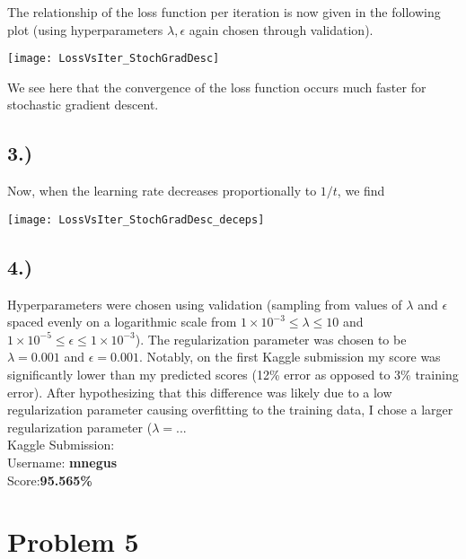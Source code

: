\documentclass{report}
\newcommand{\tab}{\-\hspace{1.5cm}}
\begin{document}
The relationship of the loss function per iteration is now given in the following plot (using hyperparameters $\lambda, \epsilon$ again chosen through validation). \\
\begin{center}
\texttt{[image: LossVsIter\_StochGradDesc]}
\end{center}

We see here that the convergence of the loss function occurs much faster for stochastic gradient descent.


\subsection*{3.)}

Now, when the learning rate decreases proportionally to $1/t$, we find
\begin{center}
\texttt{[image: LossVsIter\_StochGradDesc\_deceps]}
\end{center}


\subsection*{4.)}

Hyperparameters were chosen using validation (sampling from values of $\lambda$ and $\epsilon$ spaced evenly on a logarithmic scale from $1\times10^{-3} \leq \lambda \leq 10$ and $1\times10^{-5} \leq \epsilon \leq 1\times10^{-3}$). The regularization parameter was chosen to be $\lambda = 0.001$ and $\epsilon = 0.001$.  Notably, on the first Kaggle submission my score was significantly lower than my predicted scores (12\% error as opposed to 3\% training error). After hypothesizing that this difference was likely due to a low regularization parameter causing overfitting to the training data, I chose a larger regularization parameter ($\lambda = ... $\\

Kaggle Submission:\\
\tab Username: \textbf{mnegus}\\
\tab Score:\hspace{0.85cm}\textbf{95.565\%}\\


\newpage
\section*{Problem 5}
\end{document}
